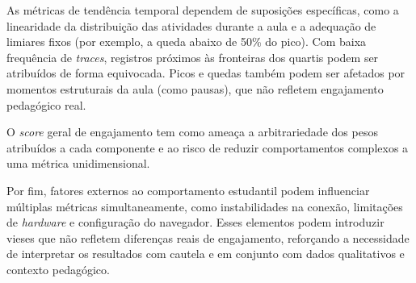 As métricas de tendência temporal dependem de suposições específicas, como a linearidade da distribuição das atividades durante a aula e a adequação de limiares fixos (por exemplo, a queda abaixo de 50\% do pico). Com baixa frequência de \textit{traces}, registros próximos às fronteiras dos quartis podem ser atribuídos de forma equivocada. Picos e quedas também podem ser afetados por momentos estruturais da aula (como pausas), que não refletem engajamento pedagógico real.

O \textit{score} geral de engajamento tem como ameaça a arbitrariedade dos pesos atribuídos a cada componente e ao risco de reduzir comportamentos complexos a uma métrica unidimensional.

Por fim, fatores externos ao comportamento estudantil podem influenciar múltiplas métricas simultaneamente, como instabilidades na conexão, limitações de \textit{hardware} e configuração do navegador. Esses elementos podem introduzir vieses que não refletem diferenças reais de engajamento, reforçando a necessidade de interpretar os resultados com cautela e em conjunto com dados qualitativos e contexto pedagógico.
